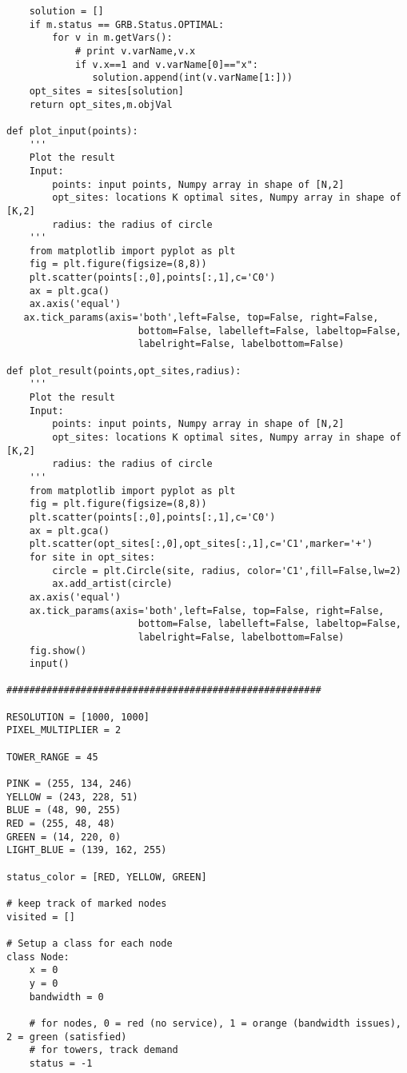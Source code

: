 \begin{singlespace}
\begin{verbatim}
    solution = []
    if m.status == GRB.Status.OPTIMAL:
        for v in m.getVars():
            # print v.varName,v.x
            if v.x==1 and v.varName[0]=="x":
               solution.append(int(v.varName[1:]))
    opt_sites = sites[solution]
    return opt_sites,m.objVal
 
def plot_input(points):
    '''
    Plot the result
    Input:
        points: input points, Numpy array in shape of [N,2]
        opt_sites: locations K optimal sites, Numpy array in shape of [K,2]
        radius: the radius of circle
    '''
    from matplotlib import pyplot as plt
    fig = plt.figure(figsize=(8,8))
    plt.scatter(points[:,0],points[:,1],c='C0')
    ax = plt.gca()
    ax.axis('equal')
   ax.tick_params(axis='both',left=False, top=False, right=False,
                       bottom=False, labelleft=False, labeltop=False,
                       labelright=False, labelbottom=False)
 
def plot_result(points,opt_sites,radius):
    '''
    Plot the result
    Input:
        points: input points, Numpy array in shape of [N,2]
        opt_sites: locations K optimal sites, Numpy array in shape of [K,2]
        radius: the radius of circle
    '''
    from matplotlib import pyplot as plt
    fig = plt.figure(figsize=(8,8))
    plt.scatter(points[:,0],points[:,1],c='C0')
    ax = plt.gca()
    plt.scatter(opt_sites[:,0],opt_sites[:,1],c='C1',marker='+')
    for site in opt_sites:
        circle = plt.Circle(site, radius, color='C1',fill=False,lw=2)
        ax.add_artist(circle)
    ax.axis('equal')
    ax.tick_params(axis='both',left=False, top=False, right=False,
                       bottom=False, labelleft=False, labeltop=False,
                       labelright=False, labelbottom=False)
    fig.show()
    input()
 
#######################################################
 
RESOLUTION = [1000, 1000]
PIXEL_MULTIPLIER = 2
 
TOWER_RANGE = 45
 
PINK = (255, 134, 246)
YELLOW = (243, 228, 51)
BLUE = (48, 90, 255)
RED = (255, 48, 48)
GREEN = (14, 220, 0)
LIGHT_BLUE = (139, 162, 255)
 
status_color = [RED, YELLOW, GREEN]
 
# keep track of marked nodes
visited = []
 
# Setup a class for each node
class Node:
    x = 0
    y = 0
    bandwidth = 0
 
    # for nodes, 0 = red (no service), 1 = orange (bandwidth issues), 2 = green (satisfied)
    # for towers, track demand
    status = -1
    

\end{verbatim}
\end{singlespace}
